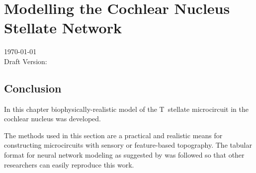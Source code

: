 \documentclass[10pt,a4paper,twoside,openright]{book}
\begin{document}
		{%
			\singlespacing%
			\tableofcontents%
			\listoffigures%
			\listoftables%
                        \printglossaries%
		   \clearpage%
		}%
\setcounter{chapter}{2}
\chapter[Simple Responses]{Modelling the Cochlear Nucleus Stellate Network \label{sec:SimpleResponsesChapter}}

\medskip{}
\centerline{\today\\ Draft Version:  }




 
 \newpage
 
 
 
 \newpage
 
 
 
 \newpage
 
 
 
  \newpage
  
  
  
 \newpage
 
 

\newpage


\section{Conclusion}

In this chapter biophysically-realistic model of the T~stellate microcircuit in the cochlear nucleus was developed.


The methods used in this section are a practical and realistic means for constructing microcircuits with sensory or feature-based topography.  
The tabular format for neural network modeling as suggested by \citet{NordlieGewaltigEtAl:2009} was followed so that other researchers can easily reproduce this work.




 

\newpage
\listoftodos
\end{document}
